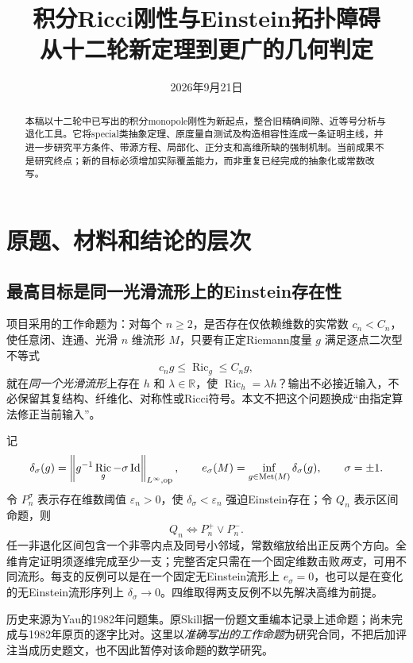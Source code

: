 \documentclass[UTF8,fontset=fandol,zihao=-4]{ctexart}
\title{积分Ricci刚性与Einstein拓扑障碍\\[2mm]\large 从十二轮新定理到更广的几何判定}
\author{}
\date{2026年9月21日}
\theoremstyle{research}
\DeclareMathOperator{\Ric}{Ric}\DeclareMathOperator{\Rm}{Rm}
\newcommand{\R}{\mathbb R}\newcommand{\Z}{\mathbb Z}\newcommand{\CP}{\mathbb{CP}}
\newcommand{\op}{\mathrm{op}}\newcommand{\dd}{\,d\mu_g}\newcommand{\av}{\fint}
\newcommand{\norm}[1]{\left\|#1\right\|}
\begin{document}
\maketitle
\begin{abstract}
本稿以十二轮中已写出的积分monopole刚性为新起点，整合旧精确间隙、近等号分析与退化工具。它将special类抽象定理、原度量自测试及构造相容性连成一条证明主线，并进一步研究平方条件、带源方程、局部化、正分支和高维所缺的强制机制。当前成果不是研究终点；新的目标必须增加实际覆盖能力，而非重复已经完成的抽象化或常数改写。
\end{abstract}
\tableofcontents
\newpage

\section{原题、材料和结论的层次}\label{sec:common}
\subsection{最高目标是同一光滑流形上的Einstein存在性}
项目采用的工作命题为：对每个 $n\ge2$，是否存在仅依赖维数的实常数 $c_n<C_n$，使任意闭、连通、光滑 $n$ 维流形 $M$，只要有正定Riemann度量 $g$ 满足逐点二次型不等式
\[
 c_ng\le\Ric_g\le C_ng,
\]
就在\emph{同一个光滑流形}上存在 $h$ 和 $\lambda\in\R$，使 $\Ric_h=\lambda h$？输出不必接近输入，不必保留其复结构、纤维化、对称性或Ricci符号。本文不把这个问题换成“由指定算法修正当前输入”。

记
\begin{equation}\label{eq:delta}
 \delta_\sigma(g)=\norm{g^{-1}\Ric_g-\sigma\Id}_{L^\infty,\op},\qquad
 e_\sigma(M)=\inf_{g\in\Met(M)}\delta_\sigma(g),\qquad \sigma=\pm1.
\end{equation}
令 $P_n^\sigma$ 表示存在维数阈值 $\varepsilon_n>0$，使 $\delta_\sigma<\varepsilon_n$ 强迫Einstein存在；令 $Q_n$ 表示区间命题，则
\begin{equation}\label{eq:logic}
 Q_n\iff P_n^+\lor P_n^-.
\end{equation}
任一非退化区间包含一个非零内点及同号小邻域，常数缩放给出正反两个方向。全维肯定证明须逐维完成至少一支；完整否定只需在一个固定维数击败\emph{两支}，可用不同流形。每支的反例可以是在一个固定无Einstein流形上 $e_\sigma=0$，也可以是在变化的无Einstein流形序列上 $\delta_\sigma\to0$。四维取得两支反例不以先解决高维为前提。

历史来源为Yau的1982年问题集\cite{Yau}。原Skill据一份题文重编本记录上述命题；尚未完成与1982年原页的逐字比对。这里以\emph{准确写出的工作命题}为研究合同，不把后加评注当成历史题文，也不因此暂停对该命题的数学研究。
\end{document}
